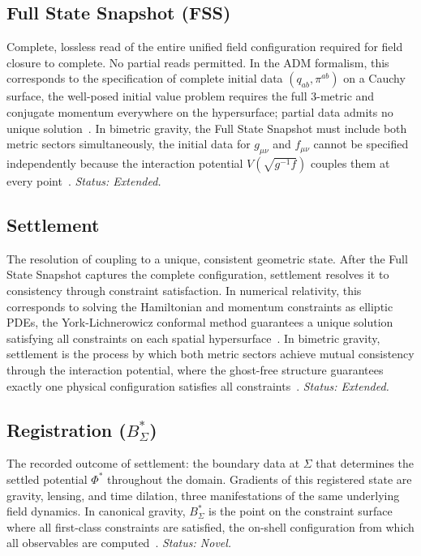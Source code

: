 \documentclass[aps,prd,preprint,superscriptaddress,showpacs,preprintnumbers,amsmath,amssymb,nofootinbib]{revtex4-2}
\begin{document}
\subsection*{Full State Snapshot (FSS)}

Complete, lossless read of the entire unified field configuration required for field closure to complete. No partial reads permitted. In the ADM formalism, this corresponds to the specification of complete initial data $(q_{ab}, \pi^{ab})$ on a Cauchy surface, the well-posed initial value problem requires the full 3-metric and conjugate momentum everywhere on the hypersurface; partial data admits no unique solution~\cite{choquetbruhat1952,wald1984}. In bimetric gravity, the Full State Snapshot must include both metric sectors simultaneously, the initial data for $g_{\mu\nu}$ and $f_{\mu\nu}$ cannot be specified independently because the interaction potential $V(\sqrt{g^{-1}f})$ couples them at every point~\cite{hassan2012}. \emph{Status: Extended.}

\subsection*{Settlement}

The resolution of coupling to a unique, consistent geometric state. After the Full State Snapshot captures the complete configuration, settlement resolves it to consistency through constraint satisfaction. In numerical relativity, this corresponds to solving the Hamiltonian and momentum constraints as elliptic PDEs, the York-Lichnerowicz conformal method guarantees a unique solution satisfying all constraints on each spatial hypersurface~\cite{york1979,choquetbruhat1952}. In bimetric gravity, settlement is the process by which both metric sectors achieve mutual consistency through the interaction potential, where the ghost-free structure guarantees exactly one physical configuration satisfies all constraints~\cite{hassan2012}. \emph{Status: Extended.}

\subsection*{Registration ($B^{*}_{\Sigma}$)}

The recorded outcome of settlement: the boundary data at $\Sigma$ that determines the settled potential $\Phi^{*}$ throughout the domain. Gradients of this registered state are gravity, lensing, and time dilation, three manifestations of the same underlying field dynamics. In canonical gravity, $B^{*}_{\Sigma}$ is the point on the constraint surface where all first-class constraints are satisfied, the on-shell configuration from which all observables are computed~\cite{dirac1964,henneaux1992}. \emph{Status: Novel.}
\end{document}
